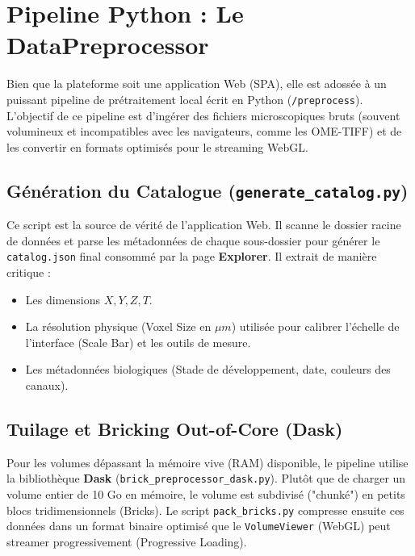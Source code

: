 \chapter{Pipeline Python : Le DataPreprocessor}
\label{chap:preprocessor}

Bien que la plateforme soit une application Web (SPA), elle est adossée à un puissant pipeline de prétraitement local écrit en Python (\texttt{/preprocess}). 
L'objectif de ce pipeline est d'ingérer des fichiers microscopiques bruts (souvent volumineux et incompatibles avec les navigateurs, comme les OME-TIFF) et de les convertir en formats optimisés pour le streaming WebGL.

\section{Génération du Catalogue (\texttt{generate\_catalog.py})}
Ce script est la source de vérité de l'application Web. Il scanne le dossier racine de données et parse les métadonnées de chaque sous-dossier pour générer le \texttt{catalog.json} final consommé par la page \textbf{Explorer}.
Il extrait de manière critique :
\begin{itemize}
    \item Les dimensions $X, Y, Z, T$.
    \item La résolution physique (Voxel Size en $\mu m$) utilisée pour calibrer l'échelle de l'interface (Scale Bar) et les outils de mesure.
    \item Les métadonnées biologiques (Stade de développement, date, couleurs des canaux).
\end{itemize}

\section{Tuilage et Bricking Out-of-Core (Dask)}
Pour les volumes dépassant la mémoire vive (RAM) disponible, le pipeline utilise la bibliothèque \textbf{Dask} (\texttt{brick\_preprocessor\_dask.py}).
Plutôt que de charger un volume entier de 10 Go en mémoire, le volume est subdivisé ("chunké") en petits blocs tridimensionnels (Bricks).
Le script \texttt{pack\_bricks.py} compresse ensuite ces données dans un format binaire optimisé que le \texttt{VolumeViewer} (WebGL) peut streamer progressivement (Progressive Loading).

